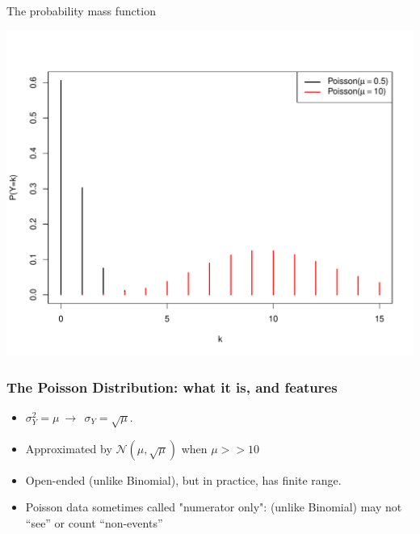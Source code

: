 \documentclass{beamer}\usepackage[]{graphicx}\usepackage[]{color}
\newenvironment{knitrout}{}{} %
\begin{document}
\begin{frame}[fragile]{The probability mass function}

\begin{knitrout}\scriptsize
{}\color{fgcolor}

{\centering \includegraphics[width=1\linewidth]{figure/unnamed-chunk-6-1} 

}



\end{knitrout}

\end{frame}
	
	
\begin{frame}
\frametitle{The Poisson Distribution: what it is, and features}

\begin{itemize}
	\setlength\itemsep{2em}
	\item  $\sigma^2_Y =  \mu \ \to \ \ \sigma_Y =  \sqrt{\mu}.$ \pause
	\item  Approximated by $\mathcal{N}(\mu, \sqrt{\mu})$ when $\mu >> 10$ \pause 
	\item Open-ended (unlike Binomial), but in practice, has finite range. 
	
	\item Poisson data sometimes called "numerator only":  (unlike Binomial) may not ``see'' or  count ``non-events''
\end{itemize}
\end{frame}
\end{document}
